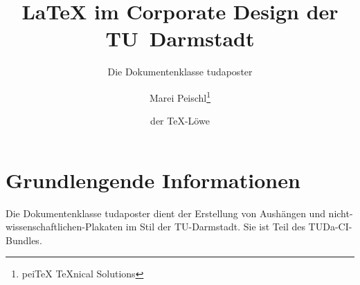 \documentclass[
	paper=a0,
	german,
	accentcolor=9c,
	logo=body,%
	footer=true,
	]{tudaposter}
\begin{document}
\title{\LaTeX{} im Corporate Design der TU~Darmstadt}
\subtitle{Die Dokumentenklasse tudaposter}
\author{Marei Peischl\thanks{pei\TeX{} \TeX{}nical Solutions}\and der \TeX-Löwe}

\titlegraphic{\color{red!20}\rule{\contentwidth}{.3\contentheight}}



\maketitle

\section*{Grundlengende Informationen}
Die Dokumentenklasse tudaposter dient der Erstellung von Aushängen und nicht-wissenschaftlichen-Plakaten im Stil der TU-Darmstadt. Sie ist Teil des TUDa-CI-Bundles.
\end{document}
